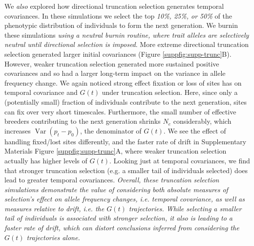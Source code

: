 \documentclass[11pt]{article}
\newcommand{\vb}[1]{{\it \color{blue} #1}}
\DeclareMathOperator{\var}{Var}
\begin{document}
We \vb{also} explored how directional truncation selection generates temporal
covariances. In these simulations we select the top \vb{10\%, 25\%, or 50\%} of
the phenotypic distribution of individuals to form the next generation. We
burnin these simulations \vb{using a neutral burnin routine, where trait
alleles are selectively neutral until directional selection is imposed}. More
extreme directional truncation selection generated larger initial covariances
(Figure \ref{suppfig:supp-trunc}B).  However, weaker truncation selection
generated more sustained positive covariances and so had a larger long-term
impact on the variance in allele frequency change.  We again noticed strong
effect fixation  or loss of sites has on temporal covariance and $G(t)$ under
truncation selection.  Here, since only a (potentially small) fraction of
individuals contribute to the next generation, sites can fix over very short
timescales. Furthermore, the small number of effective breeders contributing to
the next generation shrinks $N_e$ considerably, which increases $\var(p_t -
p_0)$, the denominator of $G(t)$. We see the effect of handling fixed/lost
sites differently, and the faster rate of drift in Supplementary Materials
Figure \ref{suppfig:supp-trunc}A, where weaker truncation selection actually
has higher levels of $G(t)$. Looking just at temporal covariances, we find that
stronger truncation selection (e.g.  a smaller tail of individuals selected)
does lead to greater temporal covariances. \vb{Overall, these truncation
  selection simulations demonstrate the value of considering both absolute
  measures of selection's effect on allele frequency changes, i.e. temporal
  covariance, as well as measures relative to drift, i.e. the $G(t)$
  trajectories. While selecting a smaller tail of individuals is associated
  with \emph{stronger} selection, it also is leading to a faster rate of drift,
which can distort conclusions inferred from considering the $G(t)$ trajectories
alone.}
\end{document}
